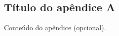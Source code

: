 \begin{apendicesenv}
\partapendices   %

\chapter{Título do apêndice A}
Conteúdo do apêndice (opcional).

\end{apendicesenv}

